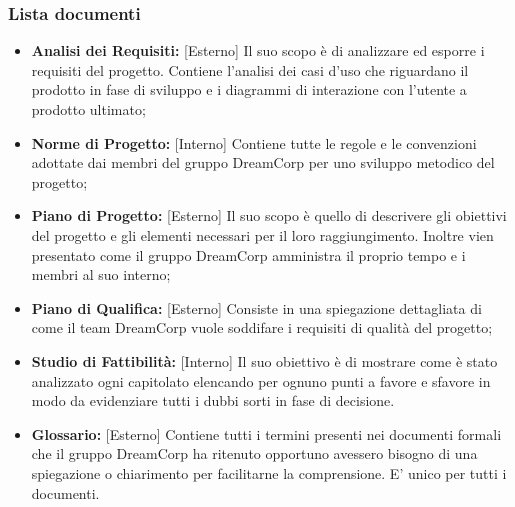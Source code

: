 		\subsubsection{Lista documenti}
		\label{3.1.5}
			\begin{itemize}
				\item \textbf{Analisi dei Requisiti: }[Esterno] \newline
				Il suo scopo è di analizzare ed esporre i requisiti del progetto. Contiene l'analisi dei casi d'uso che riguardano il prodotto in fase di sviluppo e i diagrammi di interazione con l'utente a prodotto ultimato;
				\item \textbf{Norme di Progetto: }[Interno] \newline
				Contiene tutte le regole e le convenzioni adottate dai membri del gruppo DreamCorp per uno sviluppo metodico del progetto;
				\item \textbf{Piano di Progetto: }[Esterno] \newline
				Il suo scopo è quello di descrivere gli obiettivi del progetto e gli elementi necessari per il loro raggiungimento. Inoltre vien presentato come il gruppo DreamCorp amministra il proprio tempo e i membri al suo interno;
				\item \textbf{Piano di Qualifica: }[Esterno] \newline
				Consiste in una spiegazione dettagliata di come il team DreamCorp vuole soddifare i requisiti di qualità del progetto;
				\item \textbf{Studio di Fattibilità: }[Interno] \newline
				Il suo obiettivo è di mostrare come è stato analizzato ogni capitolato elencando per ognuno punti a favore e sfavore in modo da evidenziare tutti i dubbi sorti in fase di decisione.
				\item \textbf{Glossario: }[Esterno] \newline
				Contiene tutti i termini presenti nei documenti formali che il gruppo DreamCorp ha ritenuto opportuno avessero bisogno di una spiegazione o chiarimento per facilitarne la comprensione. E' unico per tutti i documenti.
			\end{itemize}
